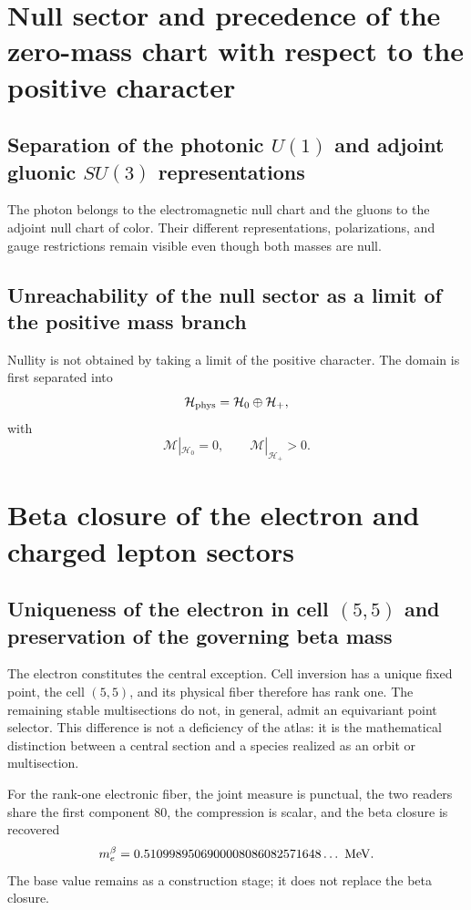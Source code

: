 \section{Null sector and precedence of the zero-mass chart with respect to the positive character}

\subsection{Separation of the photonic \texorpdfstring{\(U(1)\)}{U(1)} and adjoint gluonic \texorpdfstring{\(SU(3)\)}{SU(3)} representations}

The photon belongs to the electromagnetic null chart and the gluons to the adjoint
null chart of color. Their different representations, polarizations, and
gauge restrictions remain visible even though both masses are null.

\subsection{Unreachability of the null sector as a limit of the positive mass branch}

Nullity is not obtained by taking a limit of the positive character. The domain
is first separated into
\[
 \mathcal H_{\rm phys}=\mathcal H_0\oplus\mathcal H_+,
\]
with
\[
 \mathcal M|_{\mathcal H_0}=0,
 \qquad
 \mathcal M|_{\mathcal H_+}>0.
\]

\section{Beta closure of the electron and charged lepton sectors}

\subsection{Uniqueness of the electron in cell \texorpdfstring{\((5,5)\)}{(5,5)} and preservation of the governing beta mass}

The electron constitutes the central exception. Cell inversion has a unique fixed point, the cell \((5,5)\), and its physical fiber therefore has rank one. The remaining stable multisections do not, in general, admit an equivariant point selector. This difference is not a deficiency of the atlas: it is the mathematical distinction between a central section and a species realized as an orbit or multisection.

For the rank-one electronic fiber, the joint measure is punctual, the two
readers share the first component \(80\), the compression is scalar, and the beta closure is
recovered
\[
 m_e^\beta
 =0.5109989506900008086082571648\ldots\ {\rm MeV}.
\]
The base value remains as a construction stage; it does not replace the beta closure.

